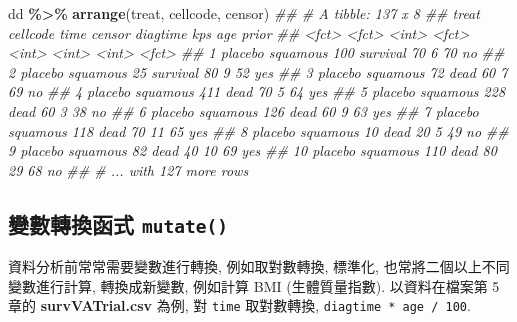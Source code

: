 \documentclass[
]{book}
\newenvironment{Shaded}{\begin{snugshade}}{\end{snugshade}}
\newcommand{\CommentTok}[1]{\textcolor[rgb]{0.56,0.35,0.01}{\textit{#1}}}
\newcommand{\KeywordTok}[1]{\textcolor[rgb]{0.13,0.29,0.53}{\textbf{#1}}}
\newcommand{\NormalTok}[1]{#1}
\newcommand{\OperatorTok}[1]{\textcolor[rgb]{0.81,0.36,0.00}{\textbf{#1}}}
\newcommand{\StringTok}[1]{\textcolor[rgb]{0.31,0.60,0.02}{#1}}
\begin{document}
\begin{Shaded}
\begin{Highlighting}[]
\NormalTok{dd }\OperatorTok{\%\textgreater{}\%}\StringTok{ }
\StringTok{  }\KeywordTok{arrange}\NormalTok{(treat, cellcode, censor)}
\CommentTok{\#\# \# A tibble: 137 x 8}
\CommentTok{\#\#    treat   cellcode  time censor   diagtime   kps   age prior}
\CommentTok{\#\#    \textless{}fct\textgreater{}   \textless{}fct\textgreater{}    \textless{}int\textgreater{} \textless{}fct\textgreater{}       \textless{}int\textgreater{} \textless{}int\textgreater{} \textless{}int\textgreater{} \textless{}fct\textgreater{}}
\CommentTok{\#\#  1 placebo squamous   100 survival       70     6    70 no   }
\CommentTok{\#\#  2 placebo squamous    25 survival       80     9    52 yes  }
\CommentTok{\#\#  3 placebo squamous    72 dead           60     7    69 no   }
\CommentTok{\#\#  4 placebo squamous   411 dead           70     5    64 yes  }
\CommentTok{\#\#  5 placebo squamous   228 dead           60     3    38 no   }
\CommentTok{\#\#  6 placebo squamous   126 dead           60     9    63 yes  }
\CommentTok{\#\#  7 placebo squamous   118 dead           70    11    65 yes  }
\CommentTok{\#\#  8 placebo squamous    10 dead           20     5    49 no   }
\CommentTok{\#\#  9 placebo squamous    82 dead           40    10    69 yes  }
\CommentTok{\#\# 10 placebo squamous   110 dead           80    29    68 no   }
\CommentTok{\#\# \# ... with 127 more rows}
\end{Highlighting}
\end{Shaded}

\hypertarget{ux8b8aux6578ux8f49ux63dbux51fdux5f0f-mutate}{%
\subsection{\texorpdfstring{變數轉換函式 \texttt{mutate()}}{變數轉換函式 mutate()}}\label{ux8b8aux6578ux8f49ux63dbux51fdux5f0f-mutate}}

資料分析前常常需要變數進行轉換, 例如取對數轉換,
標準化, 也常將二個以上不同變數進行計算, 轉換成新變數,
例如計算 BMI (生體質量指數).
以資料在檔案第 5 章的 \textbf{survVATrial.csv} 為例,
對 \texttt{time} 取對數轉換, \texttt{diagtime\ *\ age\ /\ 100}.
\end{document}
